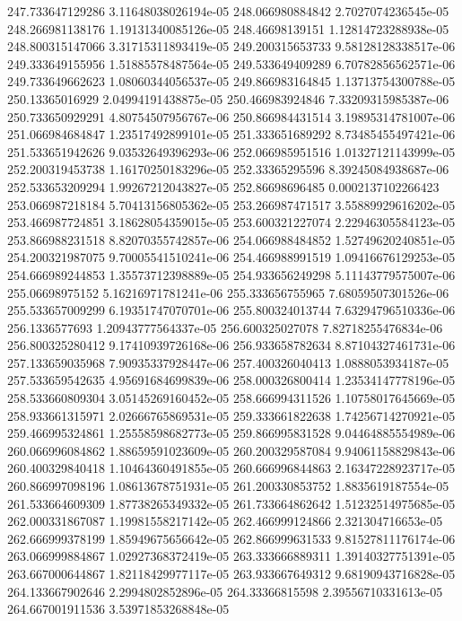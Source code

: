 {247.733647129286 3.11648038026194e-05
248.066980884842 2.7027074236545e-05
248.266981138176 1.19131340085126e-05
248.46698139151 1.12814723288938e-05
248.800315147066 3.31715311893419e-05
249.200315653733 9.58128128338517e-06
249.333649155956 1.51885578487564e-05
249.533649409289 6.70782856562571e-06
249.733649662623 1.08060344056537e-05
249.866983164845 1.13713754300788e-05
250.13365016929 2.04994191438875e-05
250.466983924846 7.33209315985387e-06
250.733650929291 4.80754507956767e-06
250.866984431514 3.19895314781007e-06
251.066984684847 1.23517492899101e-05
251.333651689292 8.73485455497421e-06
251.533651942626 9.03532649396293e-06
252.066985951516 1.01327121143999e-05
252.200319453738 1.16170250183296e-05
252.33365295596 8.39245084938687e-06
252.533653209294 1.99267212043827e-05
252.86698696485 0.0002137102266423
253.066987218184 5.70413156805362e-05
253.266987471517 3.55889929616202e-05
253.466987724851 3.18628054359015e-05
253.600321227074 2.22946305584123e-05
253.866988231518 8.82070355742857e-06
254.066988484852 1.52749620240851e-05
254.200321987075 9.70005541510241e-06
254.466988991519 1.09416676129253e-05
254.666989244853 1.35573712398889e-05
254.933656249298 5.11143779575007e-06
255.06698975152 5.16216971781241e-06
255.333656755965 7.68059507301526e-06
255.533657009299 6.19351747070701e-06
255.800324013744 7.63294796510336e-06
256.1336577693 1.20943777564337e-05
256.600325027078 7.82718255476834e-06
256.800325280412 9.17410939726168e-06
256.933658782634 8.87104327461731e-06
257.133659035968 7.90935337928447e-06
257.400326040413 1.0888053934187e-05
257.533659542635 4.95691684699839e-06
258.000326800414 1.23534147778196e-05
258.533660809304 3.05145269160452e-05
258.666994311526 1.10758017645669e-05
258.933661315971 2.02666765869531e-05
259.333661822638 1.74256714270921e-05
259.466995324861 1.25558598682773e-05
259.866995831528 9.04464885554989e-06
260.066996084862 1.88659591023609e-05
260.200329587084 9.94061158829843e-06
260.400329840418 1.10464360491855e-05
260.666996844863 2.16347228923717e-05
260.866997098196 1.08613678751931e-05
261.200330853752 1.8835619187554e-05
261.533664609309 1.87738265349332e-05
261.733664862642 1.51232514975685e-05
262.000331867087 1.19981558217142e-05
262.466999124866 2.321304716653e-05
262.666999378199 1.85949675656642e-05
262.866999631533 9.81527811176174e-06
263.066999884867 1.02927368372419e-05
263.333666889311 1.39140327751391e-05
263.667000644867 1.82118429977117e-05
263.933667649312 9.68190943716828e-05
264.133667902646 2.2994802852896e-05
264.33366815598 2.39556710331613e-05
264.667001911536 3.53971853268848e-05
}

